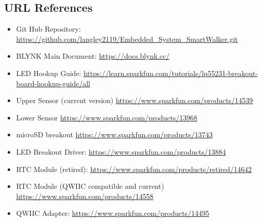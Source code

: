 \documentclass{article}
\begin{document}
\subsection{URL References}
\begin{itemize}
	\item Git Hub Repository: \url{https://github.com/langley2119/Embedded_System_SmartWalker.git}
	\item BLYNK Main Document: \url{https://docs.blynk.cc/}
	\item LED Hookup Guide:  \url{https://learn.sparkfun.com/tutorials/lp55231-breakout-board-hookup-guide/all}
	\item Upper Sensor (current version) \url{https://www.sparkfun.com/products/14539}
	\item Lower Sensor \url{https://www.sparkfun.com/products/13968}
	\item microSD breakout \url{https://www.sparkfun.com/products/13743}
	\item LED Breakout Driver: \url{https://www.sparkfun.com/products/13884}
	\item RTC Module (retired): \url{https://www.sparkfun.com/products/retired/14642}
	\item RTC Module (QWIIC compatible and current) \url{https://www.sparkfun.com/products/14558}
	\item QWIIC Adapter: \url{https://www.sparkfun.com/products/14495}
\end{itemize}
\end{document}
